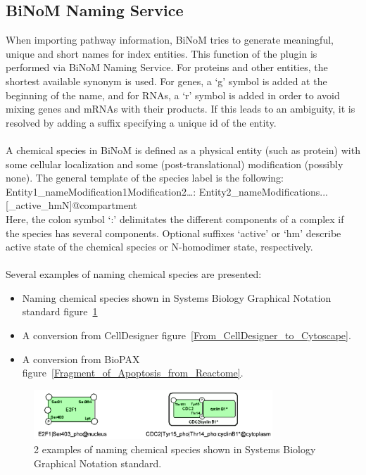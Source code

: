 \subsection{BiNoM Naming Service}\label{BiNoM_Naming_Service}
When importing pathway information, BiNoM tries to generate meaningful, unique and short names for index entities. This function of the plugin is performed via BiNoM Naming Service. For proteins and other entities, the shortest available synonym is used. For genes, a ‘g’ symbol is added at the beginning of the name, and for RNAs, a ‘r’ symbol is added in order to avoid mixing genes and mRNAs with their products. If this leads to an ambiguity, it is resolved by adding a suffix specifying a unique id of the entity.\\\\
A chemical species in BiNoM is defined as a physical entity (such as protein) with some cellular localization and some (post-translational) modification (possibly none). The general template of the species label is the following:\\
Entity1\_name\textbar Modification1\textbar Modification2\textbar…: Entity2\_name\textbar Modifications...[\_active\textbar \_hmN]@compartment\\
Here, the colon symbol ‘:’ delimitates the different components of a complex if the species has several components. Optional suffixes ‘active’ or ‘hm’ describe active state of the chemical species or N-homodimer state, respectively.\\\\ Several examples of naming chemical species are presented:
\begin{itemize}
\item Naming chemical species shown in Systems Biology Graphical Notation standard figure~\ref{Names_in_SBGN_standard}
\item A conversion from CellDesigner figure~\ref{From_CellDesigner_to_Cytoscape}.
\item A conversion from BioPAX figure~\ref{Fragment_of_Apoptosis_from_Reactome}.
\end{itemize}
\begin{figure}
\centering
\includegraphics[width=0.8\textwidth]{graphics/Names_in_SBGN_standard}
\caption{2 examples of naming chemical species shown in Systems Biology Graphical Notation standard.}
\label{Names_in_SBGN_standard}
\end{figure}
